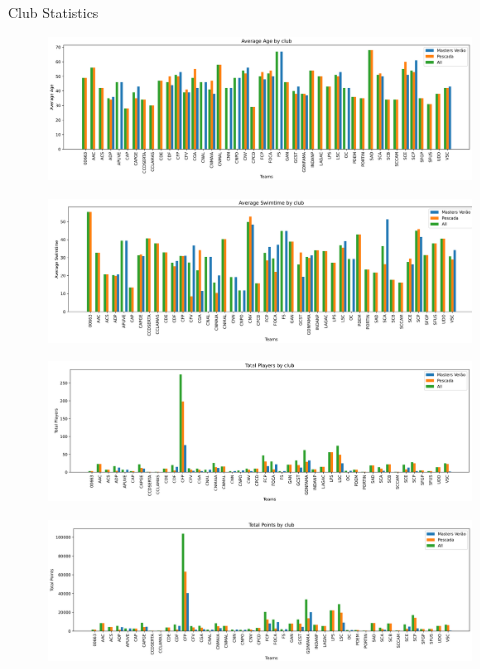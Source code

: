 \documentclass[aspectratio=169, xcolor=dvipsnames]{beamer}
\begin{document}
\begin{frame}[allowframebreaks]{Club Statistics}
\begin{figure}
    \centering
    \includegraphics[width=\textwidth]{img/stats/clubfacts1.png}
\end{figure}

\begin{figure}
    \centering
    \includegraphics[width=\textwidth]{img/stats/clubfacts2.png}
\end{figure}

\begin{figure}
    \centering
    \includegraphics[width=\textwidth]{img/stats/clubfacts3.png}
\end{figure}

\begin{figure}
    \centering
    \includegraphics[width=\textwidth]{img/stats/clubfacts4.png}
\end{figure}
\end{frame}
\end{document}
